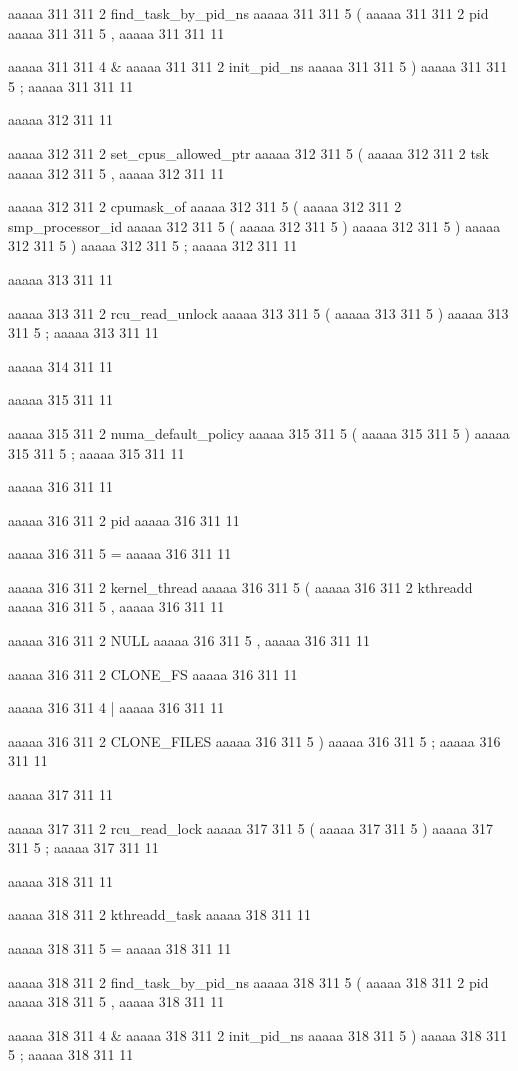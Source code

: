 {aaaaa 311 311
2
find_task_by_pid_ns
aaaaa 311 311
5
(
aaaaa 311 311
2
pid
aaaaa 311 311
5
,
aaaaa 311 311
11
 
aaaaa 311 311
4
&
aaaaa 311 311
2
init_pid_ns
aaaaa 311 311
5
)
aaaaa 311 311
5
;
aaaaa 311 311
11


aaaaa 312 311
11
	
aaaaa 312 311
2
set_cpus_allowed_ptr
aaaaa 312 311
5
(
aaaaa 312 311
2
tsk
aaaaa 312 311
5
,
aaaaa 312 311
11
 
aaaaa 312 311
2
cpumask_of
aaaaa 312 311
5
(
aaaaa 312 311
2
smp_processor_id
aaaaa 312 311
5
(
aaaaa 312 311
5
)
aaaaa 312 311
5
)
aaaaa 312 311
5
)
aaaaa 312 311
5
;
aaaaa 312 311
11


aaaaa 313 311
11
	
aaaaa 313 311
2
rcu_read_unlock
aaaaa 313 311
5
(
aaaaa 313 311
5
)
aaaaa 313 311
5
;
aaaaa 313 311
11


aaaaa 314 311
11


aaaaa 315 311
11
	
aaaaa 315 311
2
numa_default_policy
aaaaa 315 311
5
(
aaaaa 315 311
5
)
aaaaa 315 311
5
;
aaaaa 315 311
11


aaaaa 316 311
11
	
aaaaa 316 311
2
pid
aaaaa 316 311
11
 
aaaaa 316 311
5
=
aaaaa 316 311
11
 
aaaaa 316 311
2
kernel_thread
aaaaa 316 311
5
(
aaaaa 316 311
2
kthreadd
aaaaa 316 311
5
,
aaaaa 316 311
11
 
aaaaa 316 311
2
NULL
aaaaa 316 311
5
,
aaaaa 316 311
11
 
aaaaa 316 311
2
CLONE_FS
aaaaa 316 311
11
 
aaaaa 316 311
4
|
aaaaa 316 311
11
 
aaaaa 316 311
2
CLONE_FILES
aaaaa 316 311
5
)
aaaaa 316 311
5
;
aaaaa 316 311
11


aaaaa 317 311
11
	
aaaaa 317 311
2
rcu_read_lock
aaaaa 317 311
5
(
aaaaa 317 311
5
)
aaaaa 317 311
5
;
aaaaa 317 311
11


aaaaa 318 311
11
	
aaaaa 318 311
2
kthreadd_task
aaaaa 318 311
11
 
aaaaa 318 311
5
=
aaaaa 318 311
11
 
aaaaa 318 311
2
find_task_by_pid_ns
aaaaa 318 311
5
(
aaaaa 318 311
2
pid
aaaaa 318 311
5
,
aaaaa 318 311
11
 
aaaaa 318 311
4
&
aaaaa 318 311
2
init_pid_ns
aaaaa 318 311
5
)
aaaaa 318 311
5
;
aaaaa 318 311
11


}
